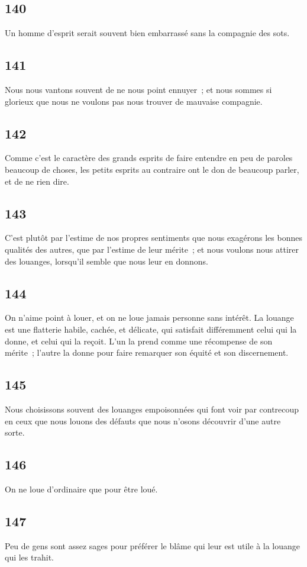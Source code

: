 \documentclass[french,twoside]{book} %
\begin{document}
\subsection[{140}]{ \textsc{140} }
\noindent Un homme d’esprit serait souvent bien embarrassé sans la compagnie des sots.
\subsection[{141}]{ \textsc{141} }
\noindent Nous nous vantons souvent de ne nous point ennuyer ; et nous sommes si glorieux que nous ne voulons pas nous trouver de mauvaise compagnie.
\subsection[{142}]{ \textsc{142} }
\noindent Comme c’est le caractère des grands esprits de faire entendre en peu de paroles beaucoup de choses, les petits esprits au contraire ont le don de beaucoup parler, et de ne rien dire.
\subsection[{143}]{ \textsc{143} }
\noindent C’est plutôt par l’estime de nos propres sentiments que nous exagérons les bonnes qualités des autres, que par l’estime de leur mérite ; et nous voulons nous attirer des louanges, lorsqu’il semble que nous leur en donnons.
\subsection[{144}]{ \textsc{144} }
\noindent On n’aime point à louer, et on ne loue jamais personne sans intérêt. La louange est une flatterie habile, cachée, et délicate, qui satisfait différemment celui qui la donne, et celui qui la reçoit. L’un la prend comme une récompense de son mérite ; l’autre la donne pour faire remarquer son équité et son discernement.
\subsection[{145}]{ \textsc{145} }
\noindent Nous choisissons souvent des louanges empoisonnées qui font voir par contrecoup en ceux que nous louons des défauts que nous n’osons découvrir d’une autre sorte.
\subsection[{146}]{ \textsc{146} }
\noindent On ne loue d’ordinaire que pour être loué.
\subsection[{147}]{ \textsc{147} }
\noindent Peu de gens sont assez sages pour préférer le blâme qui leur est utile à la louange qui les trahit.
\end{document}
